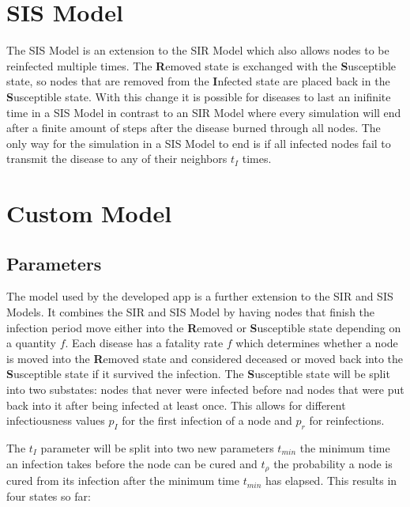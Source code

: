 \section{SIS Model}
The SIS Model is an extension to the SIR Model which also allows nodes to be reinfected multiple
times. The \textbf{R}emoved state is exchanged with the \textbf{S}usceptible state, so nodes
that are removed from the \textbf{I}nfected state are placed back in the \textbf{S}usceptible state.
With this change it is possible for diseases to last an inifinite time in a SIS Model in contrast
to an SIR Model where every simulation will end after a finite amount of steps after the 
disease burned through all nodes. The only way for the simulation in a SIS Model to end is
if all infected nodes fail to transmit the disease to any of their neighbors $t_I$ times.

\section{Custom Model}
\label{sec:custom_model}
\subsection{Parameters}
The model used by the developed app is a further extension to the SIR and SIS Models. It 
combines the SIR and SIS Model by having nodes that finish the infection period move either
into the \textbf{R}emoved or \textbf{S}usceptible state depending on a quantity $f$. Each
disease has a fatality rate $f$ which determines whether a node is moved into the 
\textbf{R}emoved state and considered deceased or moved back into the \textbf{S}usceptible
state if it survived the infection. The \textbf{S}usceptible state will be split into two
substates: nodes that never were infected before nad nodes that were put back into it after
being infected at least once. This allows for different infectiousness values $p_I$ for the
first infection of a node and $p_r$ for reinfections. 

The $t_I$ parameter will be split into two new parameters $t_{min}$ the minimum time an infection takes
before the node can be cured and $t_\rho$ the probability a node is cured from its infection
after the minimum time $t_{min}$ has elapsed. This results in four states so far:

